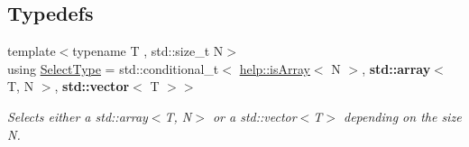 \subsection*{Typedefs}
\begin{DoxyCompactItemize}
\item 
{\footnotesize template$<$typename T , std\+::size\+\_\+t N$>$ }\\using \hyperlink{namespacecnt_1_1help_aff828fb7490c72d9e29ff571ef973a5e}{Select\+Type} = std\+::conditional\+\_\+t$<$ \hyperlink{namespacecnt_1_1help_aa31a937cfd47ea6364195d39394f8fde}{help\+::is\+Array}$<$ N $>$, {\bf std\+::array}$<$ T, N $>$, {\bf std\+::vector}$<$ T $>$$>$
\begin{DoxyCompactList}\small\item\em Selects either a \textquotesingle{}std\+::array$<$\+T, N$>$\textquotesingle{} or a \textquotesingle{}std\+::vector$<$\+T$>$\textquotesingle{} depending on the size \textquotesingle{}N\textquotesingle{}. \end{DoxyCompactList}\end{DoxyCompactItemize}
{\bf }\par
